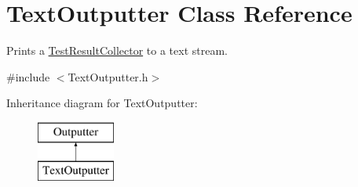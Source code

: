 \hypertarget{class_text_outputter}{}\section{Text\+Outputter Class Reference}
\label{class_text_outputter}


Prints a \hyperlink{class_test_result_collector}{Test\+Result\+Collector} to a text stream.  




{\ttfamily \#include $<$Text\+Outputter.\+h$>$}

Inheritance diagram for Text\+Outputter\+:\begin{figure}[H]
\begin{center}
\leavevmode
\includegraphics[height=2.000000cm]{class_text_outputter}
\end{center}
\end{figure}
